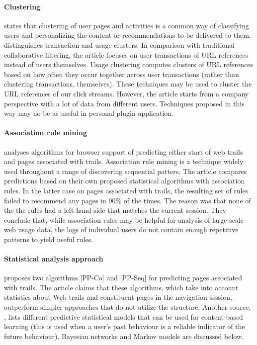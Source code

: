 \documentclass[a4paper,10pt]{article}
\begin{document}
\paragraph{Clustering} \cite{microsoft-smartfavorites} states that clustering of user pages and activities is a common way of classifying users and  personalizing the content or recommendations to be delivered to them. \cite{automatic-personalization} distinguishes transaction and usage clusters. In comparison with traditional collaborative filtering, the article focuses on user transactions of URL references instead of users themselves. Usage clustering computes clusters of URL references based on how often they occur together across user transactions (rather than clustering transactions, themselves). These techniques may be used to cluster the URL references of our click streams. However, the article starts from a company perspective with a lot of data from different users. Techniques proposed in this way may no be as useful in personal plugin application.

\paragraph{Association rule mining} \cite{microsoft-smartfavorites} analyses algorithms for browser  support of predicting either start of web trails and pages associated with trails. Association rule mining is a technique widely used throughout a range of  discovering sequential patters. The article compares predictions based on their own proposed statistical algorithms with association rules. In the latter case on pages associated with trails, the resulting set of rules failed to recommend any pages in 90\% of the times. The reason was that none of the the rules had a left-hand side that matches the current session. They conclude that, while association rules may be helpful for analysis of large-scale web usage data, the logs of individual users do not contain enough repetitive patterns to yield useful rules.

\paragraph{Statistical analysis approach} \cite{microsoft-smartfavorites} proposes two algorithms [PP-Co] and [PP-Seq] for predicting pages associated with trails. The article claims that these algorithms, which take into account statistics about Web trails and constituent pages in the navigation session, outperform  simpler approaches that do not utilize the structure. Another source, \cite{predictive-statistical-models}, lists different predictive statistical models that can be used for content-based learning (this is used when a user's past behaviour is a reliable indicator of the future behaviour). Bayesian networks and Markov models are discussed below.
\end{document}
